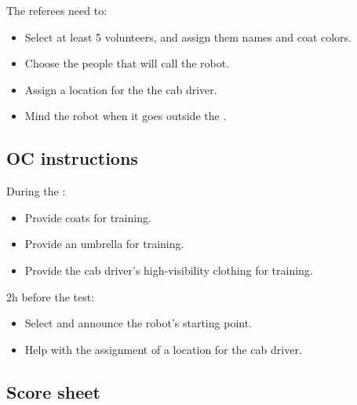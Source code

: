 The referees need to:
\begin{itemize}
	\item Select at least 5 volunteers, and assign them names and coat colors.
	\item Choose the people that will call the robot.
	\item Assign a location for the the cab driver.
	\item Mind the robot when it goes outside the \Arena{}.
\end{itemize}

\subsection*{OC instructions}

During the \SetupDays:
\begin{itemize}
	\item Provide coats for training.
	\item Provide an umbrella for training.
	\item Provide the cab driver's high-visibility clothing for training.
\end{itemize}

2h before the test:
\begin{itemize}
	\item Select and announce the robot's starting point.
	\item Help with the assignment of a location for the cab driver.
\end{itemize}

\subsection*{Score sheet}

